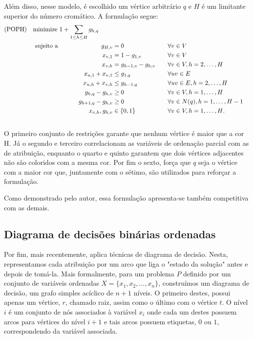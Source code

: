 \documentclass[11pt]{article}
\begin{document}
Além disso, nesse modelo, é escolhido um vértice arbitrário \(q\) e \(H\) é um limitante superior do número cromático.
A formulação segue:
\begin{alignat*}
\mathrm { (POPH) } \quad & \omit\rlap{minimize  $\displaystyle 1+\sum_{1 \leq h \leq H} g_{h, q}$} \\
& \mbox { sujeito a } && \quad & g_{H, v} &=0          & \quad & \forall v \in V \\
&                     &&   & x_{v, 1} &=1-g_{1, v} & \quad & \forall v \in V \\
&                     &&   & x_{v, h} &=g_{h-1, v}-g_{h, v} & \quad & \forall v \in V, h=2, \ldots, H \\
&                     &&   & x_{u, 1}+x_{v, 1} &\leq g_{1, q} & \quad & \forall u v \in E \\
&                     &&   & x_{u, h}+x_{v, h} &\leq g_{h-1, q} & \quad & \forall u v \in E, h=2, \ldots, H \\
&                     &&   & g_{h, q}-g_{h, v} &\geq 0 & \quad & \forall v \in V, h=1, \ldots, H \\
&                     &&   & g_{h+1, q}-g_{h, v} &\geq 0 & \quad & \forall v \in N(q), h=1, \ldots, H-1 \\
&                     &&   & x_{v, h}, g_{h, v} &\in\{0,1\} & \quad & \forall v \in V, h=1, \ldots, H \text {. } \\
&                     &&   &
\end{alignat*}
O primeiro conjunto de restrições garante que nenhum vértice é maior que a cor H.
Já o segundo e terceiro correlacionam as variáveis de ordenação parcial com as de atribuição, enquanto o quarto e quinto garantem que dois vértices adjacentes não são coloridos com a mesma cor.
Por fim o sexto, força que \(q\) seja o vértice com a maior cor que, juntamente com o sétimo, são utilizados para reforçar a formulação.

Como demonstrado pelo autor, essa formulação apresenta-se também competitiva com as demais.

\subsection{Diagrama de decisões binárias ordenadas}
\label{sec:org33d1e1f}
Por fim, mais recentemente, \textcite{Hoeve2021Graphcoloringdecision} aplica técnicas de diagrama de decisão.
Nesta, representamos cada atribuição por um arco que liga o "estado da solução" antes e depois de tomá-la.
Mais formalmente, para um problema \(P\) definido por um conjunto de variáveis ordenadas \(X = \{x_1,x_2,\dots ,x_n\}\), construímos um diagrama de decisão, um grafo simples acíclico de \(n+1\) níveis.
O primeiro destes, possui apenas um vértice, \(r\), chamado raiz, assim como o último com o vértice \(t\).
O nível \(i\) é um conjunto de nós associados à variável \(x_i\) onde cada um destes possuem arcos para vértices do nível \(i+1\) e tais arcos possuem etiquetas, \(0\) ou \(1\), correspondendo da variável associada.
\end{document}
